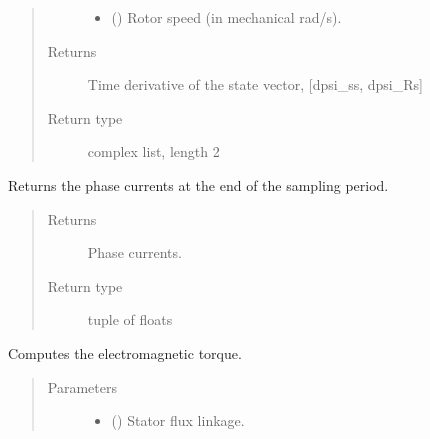 \documentclass[letterpaper,10pt,english]{sphinxmanual}
\begin{document}
\begin{fulllineitems}
\begin{fulllineitems}
\begin{quote}
\begin{description}
\begin{itemize}
\item {} 
\sphinxAtStartPar
{} () \textendash{} Rotor speed (in mechanical rad/s).

\end{itemize}

\item[{Returns}] \leavevmode
\sphinxAtStartPar
Time derivative of the state vector, {[}dpsi\_ss, dpsi\_Rs{]}

\item[{Return type}] \leavevmode
\sphinxAtStartPar
complex list, length 2

\end{description}\end{quote}

\end{fulllineitems}


\begin{fulllineitems}
\label{\detokenize{model:model.im_drive.Motor.meas_currents}}
\pysigstartsignatures
{}
\pysigstopsignatures
\sphinxAtStartPar
Returns the phase currents at the end of the sampling period.
\begin{quote}\begin{description}
\item[{Returns}] \leavevmode
\sphinxAtStartPar
{} \textendash{} Phase currents.

\item[{Return type}] \leavevmode
{}\sphinxhyphen{}tuple of floats

\end{description}\end{quote}

\end{fulllineitems}


\begin{fulllineitems}
\label{\detokenize{model:model.im_drive.Motor.torque}}
\pysigstartsignatures
{}
\pysigstopsignatures
\sphinxAtStartPar
Computes the electromagnetic torque.
\begin{quote}\begin{description}
\item[{Parameters}] \leavevmode\begin{itemize}
\item {} 
\sphinxAtStartPar
{} () \textendash{} Stator flux linkage.


\end{itemize}
\end{description}
\end{quote}
\end{fulllineitems}
\end{fulllineitems}
\end{document}
